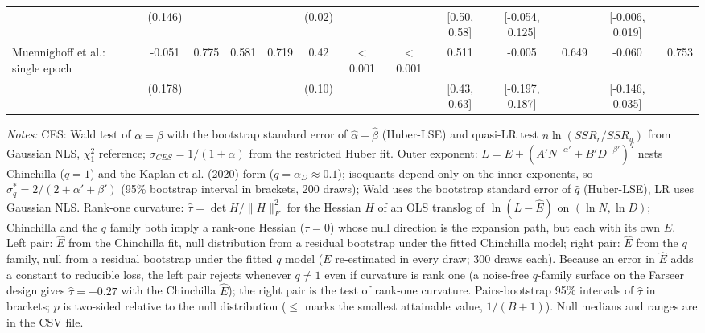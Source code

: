 \begin{landscape}
\begin{table}[!htbp]
\begin{threeparttable}
\begin{tabular}{lcccccccccccc}
 & (0.146) &  &  &  & (0.02) &  &  & [0.50, 0.58] & [-0.054, 0.125] &  & [-0.006, 0.019] &  \\[2pt]
Muennighoff et al.: single epoch & -0.051 & 0.775 & 0.581 & 0.719 & 0.42 & $<$0.001 & $<$0.001 & 0.511 & -0.005 & 0.649 & -0.060 & 0.753 \\
 & (0.178) &  &  &  & (0.10) &  &  & [0.43, 0.63] & [-0.197, 0.187] &  & [-0.146, 0.035] &  \\[2pt]
\bottomrule
\end{tabular}
\begin{tablenotes}[flushleft]
\footnotesize
\item \textit{Notes:} CES: Wald test of $\alpha=\beta$ with the bootstrap standard error of $\hat\alpha-\hat\beta$ (Huber-LSE) and quasi-LR test $n\ln(SSR_r/SSR_u)$ from Gaussian NLS, $\chi^2_1$ reference; $\sigma_{CES}=1/(1+\alpha)$ from the restricted Huber fit. Outer exponent: $L=E+(A'N^{-\alpha'}+B'D^{-\beta'})^{q}$ nests Chinchilla ($q=1$) and the Kaplan et al. (2020) form ($q=\alpha_D\approx0.1$); isoquants depend only on the inner exponents, so $\sigma^*_q=2/(2+\alpha'+\beta')$ (95\% bootstrap interval in brackets, 200 draws); Wald uses the bootstrap standard error of $\hat q$ (Huber-LSE), LR uses Gaussian NLS. Rank-one curvature: $\hat\tau=\det H/\lVert H\rVert_F^2$ for the Hessian $H$ of an OLS translog of $\ln(L-\hat E)$ on $(\ln N,\ln D)$; Chinchilla and the $q$ family both imply a rank-one Hessian ($\tau=0$) whose null direction is the expansion path, but each with its own $E$. Left pair: $\hat E$ from the Chinchilla fit, null distribution from a residual bootstrap under the fitted Chinchilla model; right pair: $\hat E$ from the $q$ family, null from a residual bootstrap under the fitted $q$ model ($E$ re-estimated in every draw; 300 draws each). Because an error in $\hat E$ adds a constant to reducible loss, the left pair rejects whenever $q\neq1$ even if curvature is rank one (a noise-free $q$-family surface on the Farseer design gives $\hat\tau=-0.27$ with the Chinchilla $\hat E$); the right pair is the test of rank-one curvature. Pairs-bootstrap 95\% intervals of $\hat\tau$ in brackets; $p$ is two-sided relative to the null distribution ($\leq$ marks the smallest attainable value, $1/(B+1)$). Null medians and ranges are in the CSV file.
\end{tablenotes}
\end{threeparttable}
\end{table}
\end{landscape}
